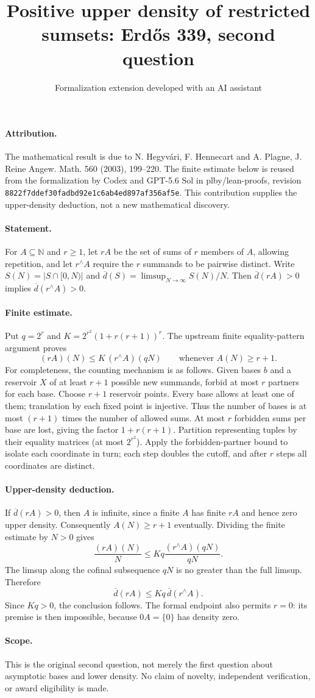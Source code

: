 \documentclass{article}
\title{Positive upper density of restricted sumsets: Erd\H{o}s 339, second question}
\author{Formalization extension developed with an AI assistant}
\date{}
\begin{document}
\maketitle
\paragraph{Attribution.} The mathematical result is due to N. Hegyv\'ari,
F. Hennecart and A. Plagne, J. Reine Angew. Math. 560 (2003), 199--220.
The finite estimate below is reused from the formalization by Codex and
GPT-5.6 Sol in plby/lean-proofs, revision
\texttt{8822f7ddef30fadbd92e1c6ab4ed897af356af5e}.
This contribution supplies the upper-density deduction, not a new mathematical discovery.

\paragraph{Statement.} For $A\subseteq\mathbb N$ and $r\ge1$, let $rA$
be the set of sums of $r$ members of $A$, allowing repetition, and let
$r^{\wedge}A$ require the $r$ summands to be pairwise distinct.
Write $S(N)=|S\cap[0,N)|$ and
$\overline d(S)=\limsup_{N\to\infty}S(N)/N$.
Then $\overline d(rA)>0$ implies $\overline d(r^{\wedge}A)>0$.

\paragraph{Finite estimate.} Put $q=2^r$ and
$K=2^{r^2}(1+r(r+1))^r$.
The upstream finite equality-pattern argument proves
\[
 (rA)(N)\le K\,(r^{\wedge}A)(qN)
 \qquad\text{whenever }A(N)\ge r+1.
\]
For completeness, the counting mechanism is as follows. Given bases $b$
and a reservoir $X$ of at least $r+1$ possible new summands, forbid at most
$r$ partners for each base. Choose $r+1$ reservoir points. Every base allows
at least one of them; translation by each fixed point is injective.
Thus the number of bases is at most $(r+1)$ times the number of allowed sums.
At most $r$ forbidden sums per base are lost, giving the factor $1+r(r+1)$.
Partition representing tuples by their equality matrices (at most $2^{r^2}$).
Apply the forbidden-partner bound to isolate each coordinate in turn;
each step doubles the cutoff, and after $r$ steps all coordinates are distinct.

\paragraph{Upper-density deduction.} If $\overline d(rA)>0$, then $A$
is infinite, since a finite $A$ has finite $rA$ and hence zero upper density.
Consequently $A(N)\ge r+1$ eventually. Dividing the finite estimate by $N>0$ gives
\[
 \frac{(rA)(N)}N\le Kq\frac{(r^{\wedge}A)(qN)}{qN}.
\]
The limsup along the cofinal subsequence $qN$ is no greater than the full
limsup. Therefore
\[
 \overline d(rA)\le Kq\,\overline d(r^{\wedge}A).
\]
Since $Kq>0$, the conclusion follows. The formal endpoint also permits
$r=0$: its premise is then impossible, because $0A=\{0\}$ has density zero.

\paragraph{Scope.} This is the original second question, not merely the
first question about asymptotic bases and lower density. No claim of novelty,
independent verification, or award eligibility is made.
\end{document}
